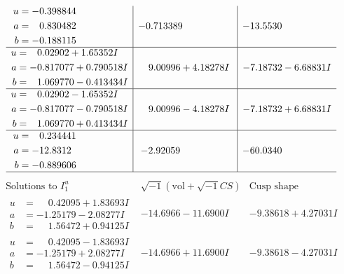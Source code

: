 \documentclass[1p]{elsarticle_modified}
\theoremstyle{definition}
\newcommand{\I}{\sqrt{-1}}
\begin{document}
$$\begin{array}{c|c|c}
\begin{aligned}
u &= -0.398844\phantom{ +0.000000I} \\
a &= \phantom{-}0.830482\phantom{ +0.000000I} \\
b &= -0.188115\phantom{ +0.000000I}\end{aligned}
 & -0.713389\phantom{ +0.000000I} & -13.5530\phantom{ +0.000000I} \\ \hline\begin{aligned}
u &= \phantom{-}0.02902 + 1.65352 I \\
a &= -0.817077 + 0.790518 I \\
b &= \phantom{-}1.069770 - 0.413434 I\end{aligned}
 & \phantom{-}9.00996 + 4.18278 I & -7.18732 - 6.68831 I \\ \hline\begin{aligned}
u &= \phantom{-}0.02902 - 1.65352 I \\
a &= -0.817077 - 0.790518 I \\
b &= \phantom{-}1.069770 + 0.413434 I\end{aligned}
 & \phantom{-}9.00996 - 4.18278 I & -7.18732 + 6.68831 I \\ \hline\begin{aligned}
u &= \phantom{-}0.234441\phantom{ +0.000000I} \\
a &= -12.8312\phantom{ +0.000000I} \\
b &= -0.889606\phantom{ +0.000000I}\end{aligned}
 & -2.92059\phantom{ +0.000000I} & -60.0340\phantom{ +0.000000I}\\
 \hline 
 \end{array}$$\newpage$$\begin{array}{c|c|c}  
\text{Solutions to }I^u_{1}& \I (\text{vol} + \sqrt{-1}CS) & \text{Cusp shape}\\
 \hline 
\begin{aligned}
u &= \phantom{-}0.42095 + 1.83693 I \\
a &= -1.25179 - 2.08277 I \\
b &= \phantom{-}1.56472 + 0.94125 I\end{aligned}
 & -14.6966 - 11.6900 I & -9.38618 + 4.27031 I \\ \hline\begin{aligned}
u &= \phantom{-}0.42095 - 1.83693 I \\
a &= -1.25179 + 2.08277 I \\
b &= \phantom{-}1.56472 - 0.94125 I\end{aligned}
 & -14.6966 + 11.6900 I & -9.38618 - 4.27031 I \\ \hline\begin{aligned}

\end{aligned}
\end{array}$$
\end{document}
